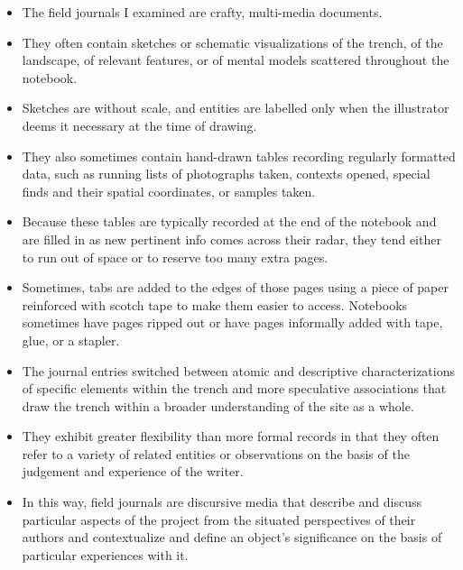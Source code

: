 \documentclass{article}
\begin{document}
\begin{itemize}
  \item The field journals I examined are crafty, multi-media documents.
  \item They often contain sketches or schematic visualizations of the trench, of the landscape, of relevant features, or of mental models scattered throughout the notebook.
  \item Sketches are without scale, and entities are labelled only when the illustrator deems it necessary at the time of drawing.
  \item They also sometimes contain hand-drawn tables recording regularly formatted data, such as running lists of photographs taken, contexts opened, special finds and their spatial coordinates, or samples taken.
  \item Because these tables are typically recorded at the end of the notebook and are filled in as new pertinent info comes across their radar, they tend either to run out of space or to reserve too many extra pages.
  \item Sometimes, tabs are added to the edges of those pages using a piece of paper reinforced with scotch tape to make them easier to access. Notebooks sometimes have pages ripped out or have pages informally added with tape, glue, or a stapler.
  
  \item The journal entries switched between atomic and descriptive characterizations of specific elements within the trench and more speculative associations that draw the trench within a broader understanding of the site as a whole.
  \item They exhibit greater flexibility than more formal records in that they often refer to a variety of related entities or observations on the basis of the judgement and experience of the writer.
  \item In this way, field journals are discursive media that describe and discuss particular aspects of the project from the situated perspectives of their authors and contextualize and define an object’s significance on the basis of particular experiences with it.
  

\end{itemize}
\end{document}
